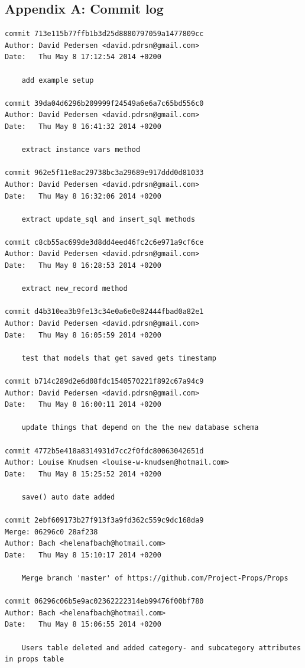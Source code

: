 \documentclass[12pt]{article}
\begin{document}
\subsection{Appendix A: Commit log}
\begin{verbatim}
commit 713e115b77ffb1b3d25d8880797059a1477809cc
Author: David Pedersen <david.pdrsn@gmail.com>
Date:   Thu May 8 17:12:54 2014 +0200

    add example setup

commit 39da04d6296b209999f24549a6e6a7c65bd556c0
Author: David Pedersen <david.pdrsn@gmail.com>
Date:   Thu May 8 16:41:32 2014 +0200

    extract instance vars method

commit 962e5f11e8ac29738bc3a29689e917ddd0d81033
Author: David Pedersen <david.pdrsn@gmail.com>
Date:   Thu May 8 16:32:06 2014 +0200

    extract update_sql and insert_sql methods

commit c8cb55ac699de3d8dd4eed46fc2c6e971a9cf6ce
Author: David Pedersen <david.pdrsn@gmail.com>
Date:   Thu May 8 16:28:53 2014 +0200

    extract new_record method

commit d4b310ea3b9fe13c34e0a6e0e82444fbad0a82e1
Author: David Pedersen <david.pdrsn@gmail.com>
Date:   Thu May 8 16:05:59 2014 +0200

    test that models that get saved gets timestamp

commit b714c289d2e6d08fdc1540570221f892c67a94c9
Author: David Pedersen <david.pdrsn@gmail.com>
Date:   Thu May 8 16:00:11 2014 +0200

    update things that depend on the the new database schema

commit 4772b5e418a8314931d7cc2f0fdc80063042651d
Author: Louise Knudsen <louise-w-knudsen@hotmail.com>
Date:   Thu May 8 15:25:52 2014 +0200

    save() auto date added

commit 2ebf609173b27f913f3a9fd362c559c9dc168da9
Merge: 06296c0 28af238
Author: Bach <helenafbach@hotmail.com>
Date:   Thu May 8 15:10:17 2014 +0200

    Merge branch 'master' of https://github.com/Project-Props/Props

commit 06296c06b5e9ac02362222314eb99476f00bf780
Author: Bach <helenafbach@hotmail.com>
Date:   Thu May 8 15:06:55 2014 +0200

    Users table deleted and added category- and subcategory attributes in props table


\end{verbatim}
\end{document}
